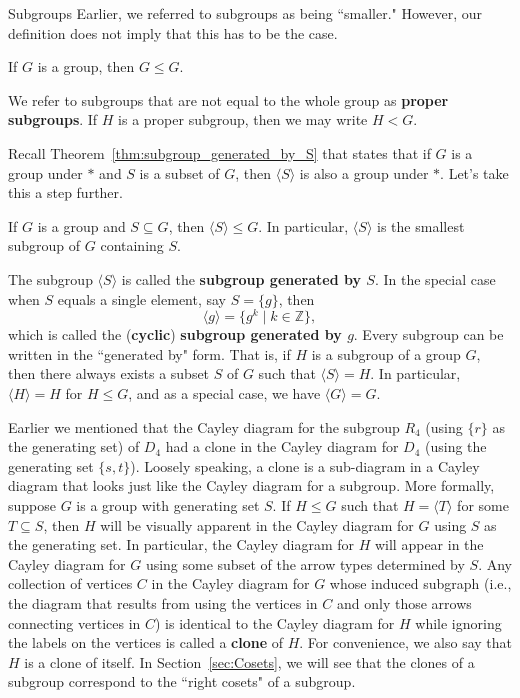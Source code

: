 \begin{section}{Subgroups}
Earlier, we referred to subgroups as being ``smaller."  However, our definition does not imply that this has to be the case.

\begin{theorem}\label{thm:improper_subgroup}
If $G$ is a group, then $G\leq G$.
\end{theorem}

We refer to subgroups that are not equal to the whole group as \textbf{proper subgroups}. If $H$ is a proper subgroup, then we may write $H<G$.

Recall Theorem~\ref{thm:subgroup_generated_by_S} that states that if $G$ is a group under $*$ and $S$ is a subset of $G$, then $\langle S\rangle$ is also a group under $*$.  Let's take this a step further.

\begin{theorem}\label{thm:smallest_subgroup_containing_S}
If $G$ is a group and $S\subseteq G$, then $\langle S\rangle \leq G$.  In particular, $\langle S\rangle$ is the smallest subgroup of $G$ containing $S$.
\end{theorem}

The subgroup $\langle S\rangle$ is called the \textbf{subgroup generated by $S$}.  In the special case when $S$ equals a single element, say $S=\{g\}$, then
\[
\langle g\rangle =\{g^k\mid k\in\mathbb{Z}\},
\]
which is called the (\textbf{cyclic}) \textbf{subgroup generated by $g$}. Every subgroup can be written in the ``generated by" form.  That is, if $H$ is a subgroup of a group $G$, then there always exists a subset $S$ of $G$ such that $\langle S\rangle=H$.  In particular, $\langle H\rangle=H$ for $H\leq G$, and as a special case, we have $\langle G\rangle=G$.

Earlier we mentioned that the Cayley diagram for the subgroup $R_4$ (using $\{r\}$ as the generating set) of $D_4$ had a clone in the Cayley diagram for $D_4$ (using the generating set $\{s,t\}$). Loosely speaking, a clone is a sub-diagram in a Cayley diagram that looks just like the Cayley diagram for a subgroup.  More formally, suppose $G$ is a group with generating set $S$. If $H\leq G$ such that $H=\langle T\rangle$ for some $T\subseteq S$, then $H$ will be visually apparent in the Cayley diagram for $G$ using $S$ as the generating set. In particular, the Cayley diagram for $H$ will appear in the Cayley diagram for $G$ using some subset of the arrow types determined by $S$. Any collection of vertices $C$ in the Cayley diagram for $G$ whose induced subgraph (i.e., the diagram that results from using the vertices in $C$ and only those arrows connecting vertices in $C$) is identical to the Cayley diagram for $H$ while ignoring the labels on the vertices is called a \textbf{clone} of $H$. For convenience, we also say that $H$ is a clone of itself.  In Section~\ref{sec:Cosets}, we will see that the clones of a subgroup correspond to the ``right cosets" of a subgroup.


\end{section}
